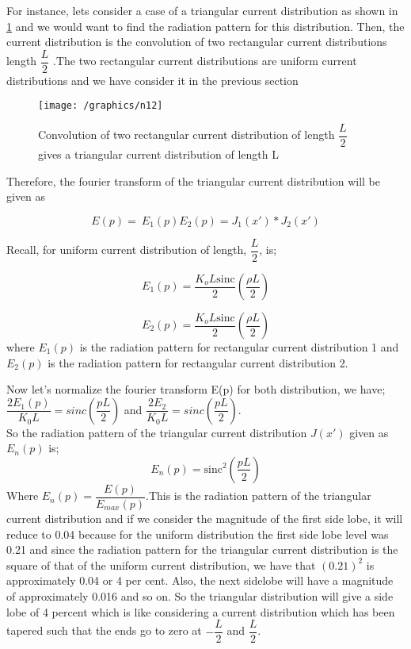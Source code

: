 For instance, lets consider a case of a triangular current distribution as shown in \ref{fig:n13} and we would want to find the radiation pattern for this distribution. Then, the current distribution is the convolution of two rectangular current distributions length $\dfrac{L}{2}$ .The two rectangular current distributions are uniform current distributions and we have consider it in the previous section
\begin{figure}[h]
\centering
\texttt{[image: /graphics/n12]}
\caption{Convolution of two rectangular current distribution of length $\dfrac{L}{2}$ gives a triangular current distribution of length L}
\label{fig:n13}
\end{figure}

Therefore, the fourier transform of the triangular current distribution will be given as

\begin{equation*}
E(p) =  \ E_1(p) E_{2}(p) = J_{1}(x') * J_{2}(x')
\end{equation*}

Recall, for uniform current distribution of length, $\dfrac{L}{2}$, is;

$$
E_{1}(p) = \dfrac{K_{o}L\text{sinc}}{2} \left(\dfrac{\rho L}{2}\right)$$

$$
E_{2}(p) = \dfrac{K_{o}L\text{sinc}}{2} \left(\dfrac{\rho L}{2}\right)$$
where $E_{1}(p)$ is the radiation pattern for rectangular current distribution 1
and $E_2(p)$ is the radiation pattern for rectangular current distribution 2.

Now let's normalize the fourier transform E(p) for both distribution, we have;\\
$\dfrac{2E_1(p)}{K_0L} = sinc(\dfrac{pL}{2})$ and $\dfrac{2E_2}{K_0L} = sinc(\dfrac{pL}{2})$.\\
So the radiation pattern of the triangular current distribution $J(x')$ given as $E_n(p)$ is;
\begin{equation}
E_n(p) = \text{sinc}^2\left(\dfrac{pL}{2}\right)
\end{equation}  
Where $E_n(p) = \dfrac{E(p)}{E_{max}(p)}$.This is the radiation pattern of the triangular current distribution and if we consider the magnitude of the first side lobe, it will reduce to 0.04 because for the uniform distribution the first side lobe level was 0.21 and since the radiation pattern for the triangular current distribution is the square of that of the uniform current distribution, we have that $(0.21)^2$ is approximately 0.04 or 4 per cent. Also, the next sidelobe will have a magnitude of approximately 0.016 and so on. So the triangular distribution will give a side lobe of 4 percent which is like considering a current distribution which has been tapered such that the ends go to zero at $-\dfrac{L}{2}$ and $\dfrac{L}{2}$.


